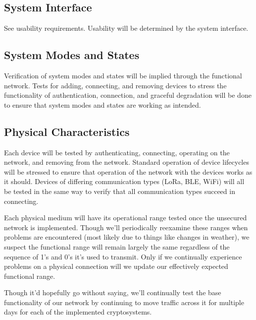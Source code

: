 \documentclass[tikz,a4paper,titlepage]{article}
\begin{document}
\subsection{System Interface} %

See usability requirements. Usability will be determined by the system interface.


\subsection{System Modes and States} %

Verification of system modes and states will be implied through the functional network. Tests for adding, connecting, and removing devices to stress the functionality of authentication, connection, and graceful degradation will be done to ensure that system modes and states are working as intended.

\subsection{Physical Characteristics} %

Each device will be tested by authenticating, connecting, operating on the network, and removing from the network. Standard operation of device lifecycles will be stressed to ensure that operation of the network with the devices works as it should. Devices of differing communication types (LoRa, BLE, WiFi) will all be tested in the same way to verify that all communication types succeed in connecting.

Each physical medium will have its operational range tested once the unsecured network is implemented. Though we'll periodically reexamine these ranges when problems are encountered (most likely due to things like changes in weather), we suspect the functional range will remain largely the same regardless of the sequence of 1's and 0's it's used to transmit. Only if we continually experience problems on a physical connection will we update our effectively expected functional range.

Though it'd hopefully go without saying, we'll continually test the base functionality of our network by continuing to move traffic across it for multiple days for each of the implemented cryptosystems.
\end{document}
